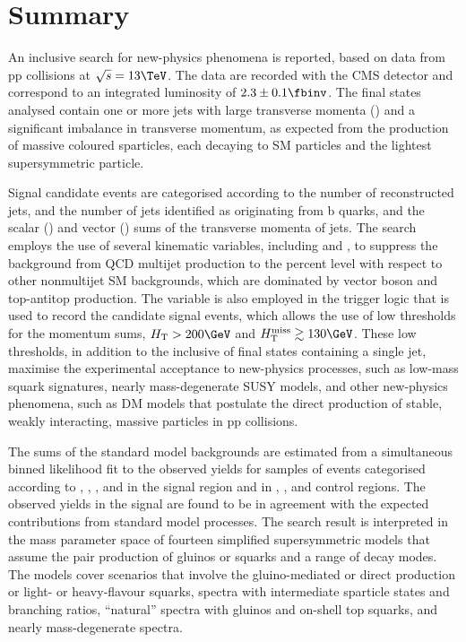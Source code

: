 \section{Summary}
\label{sec:summary}

An inclusive search for new-physics phenomena is reported, based on
data from pp collisions at $\sqrt{s} = 13\TeV$. The data are recorded
with the CMS detector and correspond to an integrated luminosity of
$2.3 \pm 0.1 \fbinv$. The final states analysed contain one or more
jets with large transverse momenta (\Pt) and a significant imbalance
in transverse momentum, as expected from the production of massive
coloured sparticles, each decaying to SM particles and the lightest
supersymmetric particle.

Signal candidate events are categorised according to the number of
reconstructed jets, and the number of jets identified as originating
from b quarks, and the scalar (\scalht) and vector (\HTmiss) sums of
the transverse momenta of jets. 
The search employs the use of several kinematic variables, including
\alphat and \bdphi, to suppress the background from QCD multijet
production to the percent level with respect to other nonmultijet SM
backgrounds, which are dominated by vector boson and top-antitop
production. The \alphat variable is also employed in the trigger logic
that is used to record the candidate signal events, which allows the
use of low thresholds for the momentum sums, $\scalht > 200\GeV$ and
$\HTmiss \gtrsim 130\GeV$. These low thresholds, in addition to the
inclusive of final states containing a single jet, maximise the
experimental acceptance to new-physics processes, such as low-mass
squark signatures, nearly mass-degenerate SUSY models, and other
new-physics phenomena, such as DM models that postulate the direct
production of stable, weakly interacting, massive particles in pp
collisions.

The sums of the standard model backgrounds are estimated from a
simultaneous binned likelihood fit to the observed yields for samples
of events categorised according to \njet, \nb, \scalht, and \HTmiss in
the signal region and in \mj, \mmj, and \gj control regions. The
observed yields in the signal are found to be in agreement with the
expected contributions from standard model processes.  The search
result is interpreted in the mass parameter space of fourteen 
simplified supersymmetric models that assume the pair production of
gluinos or squarks and a range of decay modes. The models cover
scenarios that involve the gluino-mediated or direct production or
light- or heavy-flavour squarks, spectra with intermediate sparticle
states and branching ratios, ``natural'' spectra with gluinos and
on-shell top squarks, and nearly mass-degenerate spectra.

